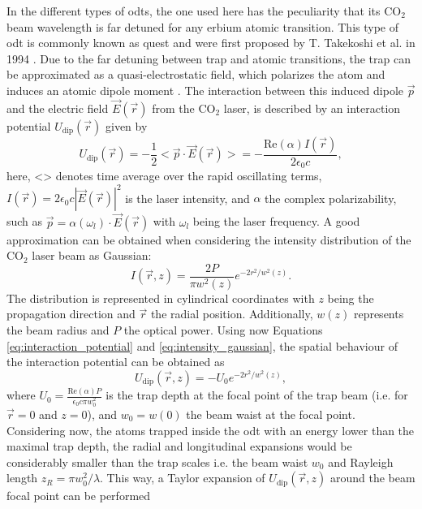 In the different types of \acp{odt}, the one used here has the peculiarity that its $\text{CO}_2$ beam wavelength is far detuned for any erbium atomic transition. This type of \ac{odt} is commonly known as \Acf{quest} and were first proposed by T. Takekoshi et al. in 1994 \cite{Takekoshi1995}. Due to the far detuning between trap and atomic transitions, the trap can be approximated as a quasi-electrostatic field, which polarizes the atom and induces an atomic dipole moment \cite{Grimm2000}. The interaction between this induced dipole $\vec{p}$ and the electric field $\vec{E}(\vec{r})$ from the $\text{CO}_2$ laser, is described by an interaction potential $U_{\text{dip}}(\vec{r})$ given by
\begin{equation}\label{eq:interaction_potential}
	U_{\text{dip}}(\vec{r}) = -\frac{1}{2} <\vec{p} \cdot \vec{E}(\vec{r})>=-\frac{\text{Re}(\alpha) I(\vec{r})}{2 \epsilon_0 c},
\end{equation}
here, <> denotes time average over the rapid oscillating terms, $I(\vec{r}) = 2 \epsilon_0 c |\vec{E}(\vec{r})|^2$ is the laser intensity, and $\alpha$ the complex polarizability, such as $\vec{p} = \alpha(\omega_l) \cdot \vec{E}(\vec{r})$ with $\omega_l$ being the laser frequency. A good approximation can be obtained when considering the intensity distribution of the $\text{CO}_2$ laser beam as Gaussian:
\begin{equation}\label{eq:intensity_gaussian}
	I(\vec{r}, z) = \frac{2P}{\pi w^2(z)} e^{-2r^2/w^2(z)}.
\end{equation}
The distribution is represented in cylindrical coordinates with $z$ being the propagation direction and $\vec{r}$ the radial position. Additionally, $w(z)$ represents the beam radius and $P$ the optical power. Using now Equations \eqref{eq:interaction_potential} and \eqref{eq:intensity_gaussian}, the spatial behaviour of the interaction potential can be obtained as
\begin{equation}\label{eq:dipole_potential}
	U_{\text{dip}}(\vec{r}, z) =  -U_0 e^{-2r^2/w^2(z)},
\end{equation}
where $U_0 = \frac{\text{Re}(\alpha) P}{\epsilon_0 c \pi w_0^2}$ is the trap depth at the focal point of the trap beam (i.e. for $\vec{r} = 0$ and $z=0$), and $w_0=w(0)$ the beam waist at the focal point. Considering now, the atoms trapped inside the \ac{odt} with an energy lower than the maximal trap depth, the radial and longitudinal expansions would be considerably smaller than the trap scales i.e. the beam waist $w_0$ and Rayleigh length $z_R = \pi w_0^2/ \lambda$. This way, a Taylor expansion of $U_{\text{dip}}(\vec{r}, z)$  around the beam focal point can be performed
